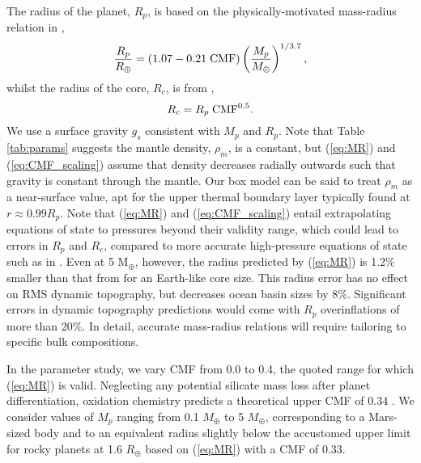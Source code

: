 The radius of the planet, $R_p$, is based on the physically-motivated mass-radius relation in \citet{zeng_massradius_2016},
\begin{equation}\label{eq:MR}
\frac{R_p}{R_\oplus} = (1.07 - 0.21\; {\rm CMF})\left(\frac{M_p}{M_\oplus}\right)^{1/3.7},
\end{equation}
whilst the radius of the core, $R_c$, is from \citet{zeng_simple_2017},
\begin{equation}\label{eq:CMF_scaling}
R_c = R_p \; {\rm CMF}^{0.5}.
\end{equation}
We use a surface gravity $g_s$ consistent with $M_p$ and $R_p$. Note that Table \ref{tab:params} suggests the mantle density, $\rho_m$, is a constant, but (\ref{eq:MR}) and (\ref{eq:CMF_scaling}) assume that density decreases radially outwards such that gravity is constant through the mantle. Our box model can be said to treat $\rho_m$ as a near-surface value, apt for the upper thermal boundary layer typically found at $r \approx 0.99R_p$. Note that (\ref{eq:MR}) and (\ref{eq:CMF_scaling}) entail extrapolating equations of state to pressures beyond their validity range, which could lead to errors in $R_p$ and $R_c$, compared to more accurate high-pressure equations of state such as in \citet{hakim_new_2018}. Even at 5 M$_\oplus$, however, the radius predicted by (\ref{eq:MR}) is 1.2\% smaller than that from \citet{hakim_new_2018} for an Earth-like core size. This radius error has no effect on RMS dynamic topography, but decreases ocean basin sizes by 8\%. Significant errors in dynamic topography predictions would come with $R_p$ overinflations of more than 20\%. In detail, accurate mass-radius relations will require tailoring to specific bulk compositions.


In the parameter study, we vary CMF from 0.0 to 0.4, the quoted range for which (\ref{eq:MR}) is valid. Neglecting any potential silicate mass loss after planet differentiation, oxidation chemistry predicts a theoretical upper CMF of 0.34 \citep{dyck_effect_2021}. We consider values of $M_p$ ranging from 0.1 $M_\oplus$ to 5 $M_\oplus$, corresponding to a Mars-sized body and to an equivalent radius slightly below the accustomed upper limit for rocky planets at 1.6 $R_\oplus$ \citep{rogers_most_2015} based on (\ref{eq:MR}) with a CMF of 0.33.
 



